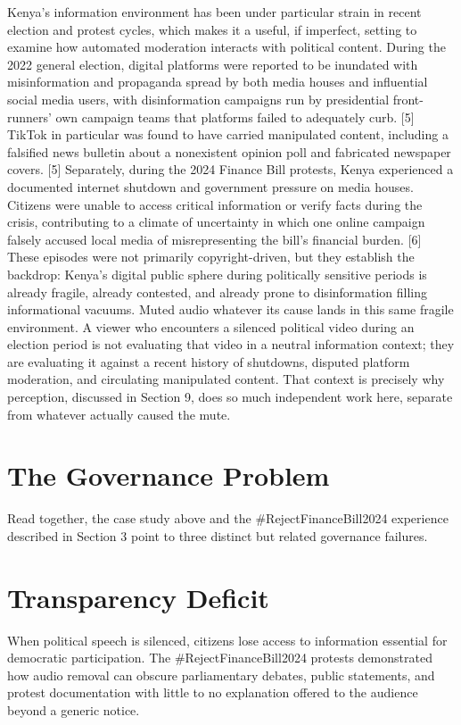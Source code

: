 \documentclass{article}
\begin{document}
\par 
Kenya’s information environment has been under particular strain in recent election and protest cycles, which makes it a useful, if imperfect, setting to examine how automated moderation interacts with political content. During the 2022 general election, digital platforms were reported to be inundated with misinformation and propaganda spread by both media houses and influential social media users, with disinformation campaigns run by presidential front-runners’ own campaign teams that platforms failed to adequately curb. [5] TikTok in particular was found to have carried manipulated content, including a falsified news bulletin about a nonexistent opinion poll and fabricated newspaper covers. [5]
Separately, during the 2024 Finance Bill protests, Kenya experienced a documented internet shutdown and government pressure on media houses. Citizens were unable to access critical information or verify facts during the crisis, contributing to a climate of uncertainty in which one online campaign falsely accused local media of misrepresenting the bill’s financial burden. [6] These episodes were not primarily copyright-driven, but they establish the backdrop: Kenya’s digital public sphere during politically sensitive periods is already fragile, already contested, and already prone to disinformation filling informational vacuums. Muted audio whatever its cause lands in this same fragile environment. A viewer who encounters a silenced political video during an election period is not evaluating that video in a neutral information context; they are evaluating it against a recent history of shutdowns, disputed platform moderation, and circulating manipulated content. That context is precisely why perception, discussed in Section 9, does so much independent work here, separate from whatever actually caused the mute.
\section{The Governance Problem}
\par 
Read together, the case study above and the \#RejectFinanceBill2024 experience described in Section 3 point to three distinct but related governance failures.
\section{Transparency Deficit}
\par 
When political speech is silenced, citizens lose access to information essential for democratic participation. The \#RejectFinanceBill2024 protests demonstrated how audio removal can obscure parliamentary debates, public statements, and protest documentation with little to no explanation offered to the audience beyond a generic notice.
\end{document}
